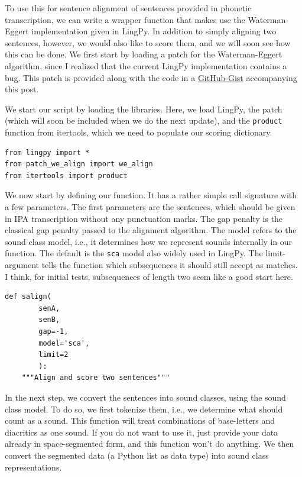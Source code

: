 \documentclass[
  a4paper,
  14pt,
  oneside,
  tablecaptionabove
]{scrbook}
\newcommand{\passthrough}[1]{#1}
\begin{document}
To use this for sentence alignment of sentences provided in phonetic
transcription, we can write a wrapper function that makes use the
Waterman-Eggert implementation given in LingPy. In addition to simply
aligning two sentences, however, we would also like to score them, and
we will soon see how this can be done. We first start by loading a patch
for the Waterman-Eggert algorithm, since I realized that the current
LingPy implementation contains a bug. This patch is provided along with
the code in a
\href{https://gist.github.com/LinguList/8189f06f231909fbf1d1eed30998bd83}{GitHub-Gist}
accompanying this post.

We start our script by loading the libraries. Here, we load LingPy, the
patch (which will soon be included when we do the next update), and the
\passthrough{\lstinline!product!} function from itertools, which we need
to populate our scoring dictionary.

\begin{lstlisting}
from lingpy import *
from patch_we_align import we_align
from itertools import product
\end{lstlisting}

We now start by defining our function. It has a rather simple call
signature with a few parameters. The first parameters are the sentences,
which should be given in IPA transcription without any punctuation
marks. The gap penalty is the classical gap penalty passed to the
alignment algorithm. The model refers to the sound class model, i.e., it
determines how we represent sounds internally in our function. The
default is the \passthrough{\lstinline!sca!} model also widely used in
LingPy. The limit-argument tells the function which subsequences it
should still accept as matches. I think, for initial tests, subsequences
of length two seem like a good start here.

\begin{lstlisting}
def salign(
        senA,
        senB,
        gap=-1,
        model='sca',
        limit=2
        ):
    """Align and score two sentences"""
\end{lstlisting}

In the next step, we convert the sentences into sound classes, using the
sound class model. To do so, we first tokenize them, i.e., we determine
what should count as a sound. This function will treat combinations of
base-letters and diacritics as one sound. If you do not want to use it,
just provide your data already in space-segmented form, and this
function won't do anything. We then convert the segmented data (a Python
list as data type) into sound class representations.
\end{document}
